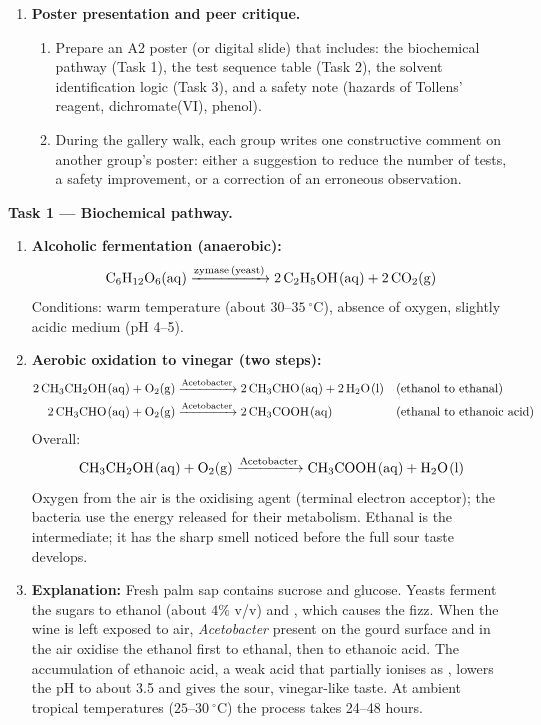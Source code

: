 \documentclass[11pt]{article}
\newcounter{popsec}
\newcounter{popsub}
\newcommand{\courssub}[1]{%
  \stepcounter{popsub}%
  \par\vspace{9pt}\noindent{\popxbold\fontsize{11.5}{13}\selectfont\color{popink}{\color{poporange}\thepopsec.\thepopsub}\hspace{6pt}#1}\par\nopagebreak\vspace{4pt}
}
\begin{document}
\begin{enumerate}
    \item \textbf{Poster presentation and peer critique.}
    \begin{enumerate}
        \item Prepare an A2 poster (or digital slide) that includes: the biochemical pathway (Task 1), the test sequence table (Task 2), the solvent identification logic (Task 3), and a safety note (hazards of Tollens' reagent, dichromate(VI), phenol).
        \item During the gallery walk, each group writes one constructive comment on another group's poster: either a suggestion to reduce the number of tests, a safety improvement, or a correction of an erroneous observation.
    \end{enumerate}
\end{enumerate}

\courssub{Model answer}
\textbf{Task 1 --- Biochemical pathway.}\par
\begin{enumerate}
    \item \textbf{Alcoholic fermentation (anaerobic):}
    \[\ce{C6H12O6(aq) ->[zymase (yeast)] 2 C2H5OH(aq) + 2 CO2(g)}\]
    Conditions: warm temperature (about $30$--$35\ ^\circ\mathrm{C}$), absence of oxygen, slightly acidic medium (pH 4--5).
    \item \textbf{Aerobic oxidation to vinegar (two steps):}
    \begin{align*}
    \ce{2 CH3CH2OH(aq) + O2(g) &->[Acetobacter] 2 CH3CHO(aq) + 2 H2O(l)} && \text{(ethanol to ethanal)} \\
    \ce{2 CH3CHO(aq) + O2(g) &->[Acetobacter] 2 CH3COOH(aq)} && \text{(ethanal to ethanoic acid)}
    \end{align*}
    Overall: \[\ce{CH3CH2OH(aq) + O2(g) ->[Acetobacter] CH3COOH(aq) + H2O(l)}\]
    Oxygen from the air is the oxidising agent (terminal electron acceptor); the bacteria use the energy released for their metabolism. Ethanal is the intermediate; it has the sharp smell noticed before the full sour taste develops.
    \item \textbf{Explanation:} Fresh palm sap contains sucrose and glucose. Yeasts ferment the sugars to ethanol (about $4\%$ v/v) and , which causes the fizz. When the wine is left exposed to air, \emph{Acetobacter} present on the gourd surface and in the air oxidise the ethanol first to ethanal, then to ethanoic acid. The accumulation of ethanoic acid, a weak acid that partially ionises as , lowers the pH to about 3.5 and gives the sour, vinegar-like taste. At ambient tropical temperatures ($25$--$30\ ^\circ\mathrm{C}$) the process takes 24--48 hours.
\end{enumerate}
\end{document}
